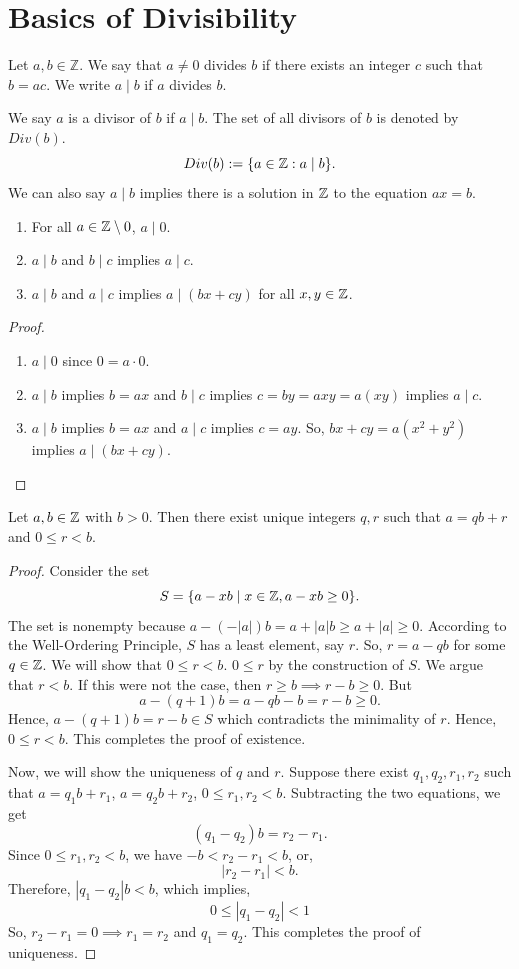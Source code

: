 \section{Basics of Divisibility}
\begin{definition}[Divisibility]
    Let $a,b\in\mathbb{Z}$. We say that $a \neq 0$ divides $b$ if there exists an integer $c$ such that $b=ac$. We write $a\mid b$ if $a$ divides $b$.
\end{definition}
We say $a$ is a divisor of $b$ if $a\mid b$. The set of all divisors of $b$ is denoted by $Div(b)$.
\[
Div(b) := \{a \in \mathbb{Z}: a \mid b\}.
\]
We can also say $a \mid b$ implies there is a solution in $\mathbb{Z}$ to the equation $ax=b$.
\begin{prop}
    \begin{enumerate}
        \item For all $a\in\mathbb{Z} \setminus {0}$, $a\mid 0$.
        \item $a\mid b$ and $b\mid c$ implies $a\mid c$.
        \item $a \mid b$ and $a \mid c$ implies $a \mid (bx+cy)$ for all $x,y\in\mathbb{Z}$.
    \end{enumerate}
\end{prop}
\begin{proof}
    \begin{enumerate}
        \item $a\mid 0$ since $0=a\cdot 0$.
        \item $a\mid b$ implies $b=ax$ and $b\mid c$ implies $c=by=axy=a(xy)$ implies $a \mid c$.
        \item $a\mid b$ implies $b=ax$ and $a\mid c$ implies $c=ay$. So, $bx+cy=a(x^2+y^2)$ implies $a \mid (bx+cy)$.
    \end{enumerate}
\end{proof}
\begin{theorem}
    Let $a,b\in\mathbb{Z}$ with $b>0$. Then there exist unique integers $q,r$ such that $a=qb+r$ and $0\leq r<b$.
\end{theorem}
\begin{proof}
    Consider the set
    \[S = \{a - xb \mid x\in\mathbb{Z}, a-xb \ge 0\}.\]
    The set is nonempty because $a - (-|a|)b = a + |a|b \ge a + |a| \ge 0.$ According to the Well-Ordering Principle, $S$ has a least element, say $r$. So, $r = a - qb$ for some $q\in\mathbb{Z}$. We will show that $0\leq r < b$. $0 \le r$ by the construction of $S$. We argue that $r < b$. If this were not the case, then $r \ge b \implies r - b \ge 0$. But 
    \[
    a - (q+1)b = a - qb - b = r - b \ge 0.
    \]
    Hence, $a - (q+1)b = r - b \in S$ which contradicts the minimality of $r$. Hence, $0\leq r < b$. This completes the proof of existence.

    Now, we will show the uniqueness of $q$ and $r$. Suppose there exist $q_1, q_2, r_1, r_2$ such that $a = q_1b + r_1$, $a = q_2b + r_2$, $0\leq r_1, r_2 < b$. Subtracting the two equations, we get \[(q_1 - q_2)b = r_2 - r_1.\] Since $0\leq r_1, r_2 < b$, we have $-b < r_2 - r_1 < b$, or, \[|r_2 - r_1| < b.\] Therefore, $|q_1-q_2|b < b$, which implies,
    \[0 \le |q_1 - q_2| < 1\]
    So, $r_2 - r_1 = 0 \implies r_1 = r_2$ and $q_1 = q_2$. This completes the proof of uniqueness.
\end{proof}
